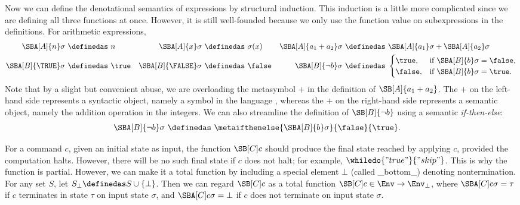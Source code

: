 Now we can define the denotational semantics of expressions by structural induction. This induction is a little more complicated since we are defining all three functions at once. However, it is still well-founded because we only use the function value on subexpressions in the definitions. For arithmetic expressions,
\begin{align*}
\SBA[A]{n}\sigma\ &\definedas\ n & 
\SBA[A]{x}\sigma\ &\definedas\ \sigma(x) &
\SBA[A]{a_{1}+a_{2}}\sigma\ &\definedas\ \SBA[A]{a_1}\sigma + \SBA[A]{a_2}\sigma\\
\SBA[B]{\TRUE} \sigma\ &\definedas\ \true &
\SBA[B]{\FALSE} \sigma\ &\definedas\ \false &
\SBA[B]{\neg b} \sigma\ &\definedas\ 
 \begin{cases}
	\true, & \text{if $\SBA[B]{b} \sigma = \false$,}\\
	\false, & \text{if $\SBA[B]{b} \sigma = \true$.} 
 \end{cases}
\end{align*}
Note that by a slight but convenient abuse, we are overloading the metasymbol $+$ in the definition of $\SB[A]{a_{1}+a_{2}}$. The $+$ on the left-hand side represents a syntactic object, namely a symbol in the language \IMP, whereas the $+$ on the right-hand side represents a semantic object, namely the addition operation in the integers. We can also streamline the definition of $\SB[B]{\neg b}$ using a semantic \textsl{if-then-else}:
\begin{align*}
\SBA[B]{\neg b}\sigma\ &\definedas\ \metaifthenelse{\SBA[B]{b}\sigma}{\false}{\true}.
\end{align*}

For a command $c$, given an initial state as input, the function $\SB[C]c$ should produce the final state reached by applying $c$, provided the computation halts. However, there will be no such final state if $c$ does not halt; for example, $\whiledo{"true"}{"skip"}$. This is why the function is partial. However, we can make it a total function by including a special element $\bot$ (called _bottom_) denoting nontermination. For any set $S$, let $S_{\bot} \definedas S \cup \{\bot\}$. Then we can regard $\SB[C]c$ as a total function $\SB[C]c \in \Env \to \Env_{\bot}$, where $\SBA[C]c\sigma=\tau$ if $c$ terminates in state $\tau$ on input state $\sigma$, and $\SBA[C]c\sigma=\bot$ if $c$ does not terminate on input state $\sigma$.


